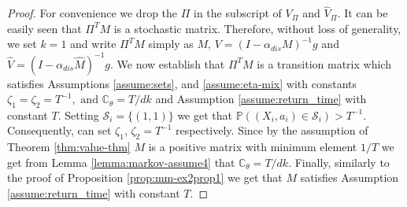 \documentclass[opre,sglanonrev]{informs4}
\numberwithin{equation}{section}
\newcommand{\lp}{\left(}
\newcommand{\rp}{\right)}
\newcommand{\Cbb}{\mathbb{C}}
\newcommand{\Pbb}{\mathbb{P}}
\newcommand{\Scal}{\mathcal{S}}
\newcommand{\constant}{\Cbb}
\newcommand{\prob}{\Pbb}
\begin{document}
\begin{APPENDICES}
\begin{proof}
For convenience we drop the $\Pi$ in the subscript of $V_\Pi$ and $\hat V_\Pi$. It can be easily seen that $\Pi^T M$ is a stochastic matrix. 
Therefore, without loss of generality, we set $k=1$ and write $\Pi^TM$ simply as $M$, $V = \lp I -  \alpha_{dis} M\rp^{-1}g$  and  $\hat V = \lp I -  \alpha_{dis} \hat M\rp^{-1}g$. 
We now establish that $\Pi^T M$ is a transition matrix which satisfies Assumptions \ref{assume:sets}, and \ref{assume:eta-mix} with constants $\zeta_1=\zeta_2=T^{-1}, \text{ and } \constant_\theta =T/dk$ and Assumption \ref{assume:return_time} with constant $T$. Setting $\Scal_i = \{(1,1)\}$ we get that $\prob\lp (X_i,a_i)\in\Scal_i\rp>T^{-1}$. Consequently, can set $\zeta_1$, $\zeta_2=T^{-1}$ respectively. Since by the assumption of Theorem \ref{thm:value-thm} $M$ is a positive matrix with minimum element $1/T$ we get from Lemma \ref{lemma:markov-assume4} that $\constant_\theta=T/dk$. Finally, similarly to the proof of Proposition \ref{prop:mm-ex2prop1} we get that $M$ satisfies Assumption \ref{assume:return_time} with constant $T$.


\end{proof}
\end{APPENDICES}
\end{document}
